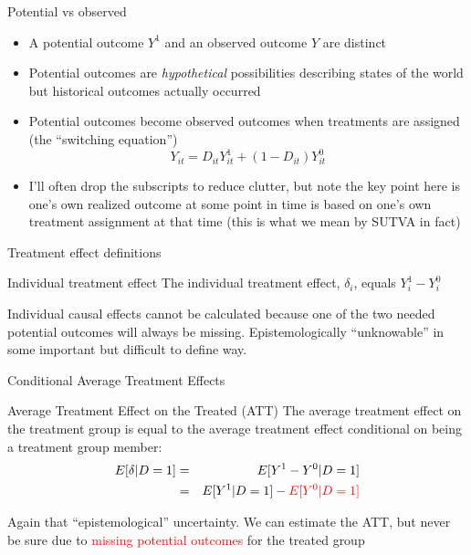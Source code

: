 \documentclass{beamer}
\begin{document}
\begin{frame}{Potential vs observed}

\begin{itemize}
\item A potential outcome $Y^1$ and an observed outcome $Y$ are distinct
\item Potential outcomes are \emph{hypothetical} possibilities describing states of the world but historical outcomes actually occurred
\item Potential outcomes become observed outcomes when treatments are assigned (the ``switching equation'') $$Y_{it}=D_{it}Y_{it}^1 + (1-D_{it})Y_{it}^0$$
\item I'll often drop the subscripts to reduce clutter, but note the key point here is one's own realized outcome at some point in time is based on one's own treatment assignment at that time (this is what we mean by SUTVA in fact)

\end{itemize}
\end{frame}



\begin{frame}{Treatment effect definitions}


	\begin{block}{Individual treatment effect}
	    The individual treatment effect,  $\delta_i$, equals $Y_i^1-Y_i^0$
	\end{block}

Individual causal effects cannot be calculated because one of the two needed potential outcomes will always be missing. Epistemologically ``unknowable'' in some important but difficult to define way.	
	
\end{frame}


\begin{frame}{Conditional Average Treatment Effects}	
	\begin{block}{Average Treatment Effect on the Treated (ATT)}
	The average treatment effect on the treatment group is equal to the average treatment effect conditional on being a treatment group member:
		\begin{eqnarray*}
		E[\delta|D=1]&=&E[Y^1-Y^0|D=1] \nonumber \\
		&=&E[Y^1|D=1]-\textcolor{red}{E[Y^0|D=1]}
		\end{eqnarray*}
	\end{block}
	
	\bigskip
	
 Again that ``epistemological'' uncertainty.  We can estimate the ATT, but never be sure due to \textcolor{red}{missing potential outcomes} for the treated group

	
\end{frame}
\end{document}
